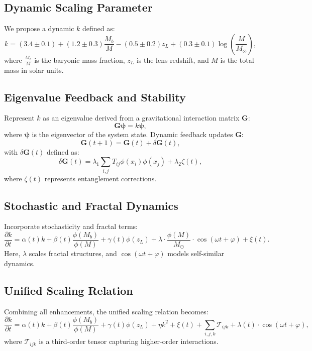\documentclass[12]{amsart}
\theoremstyle{plain}
\begin{document}
\subsection{Dynamic Scaling Parameter}
We propose a dynamic $k$ defined as:
\begin{equation}
    k = (3.4 \pm 0.1) + (1.2 \pm 0.3) \frac{M_b}{M} - (0.5 \pm 0.2) z_L + (0.3 \pm 0.1) \log\left(\frac{M}{M_\odot}\right),
\end{equation}
where $\frac{M_b}{M}$ is the baryonic mass fraction, $z_L$ is the lens redshift, and $M$ is the total mass in solar units.

\subsection{Eigenvalue Feedback and Stability}
Represent $k$ as an eigenvalue derived from a gravitational interaction matrix $\mathbf{G}$:
\begin{equation}
    \mathbf{G} \bm{\psi} = k \bm{\psi},
\end{equation}
where $\bm{\psi}$ is the eigenvector of the system state. Dynamic feedback updates $\mathbf{G}$:
\begin{equation}
    \mathbf{G}(t+1) = \mathbf{G}(t) + \delta \mathbf{G}(t),
\end{equation}
with $\delta \mathbf{G}(t)$ defined as:
\begin{equation}
    \delta \mathbf{G}(t) = \lambda_1 \sum_{i,j} T_{ij} \phi(x_i) \phi(x_j) + \lambda_2 \zeta(t),
\end{equation}
where $\zeta(t)$ represents entanglement corrections.

\subsection{Stochastic and Fractal Dynamics}
Incorporate stochasticity and fractal terms:
\begin{equation}
    \frac{\partial k}{\partial t} = \alpha(t) k + \beta(t) \frac{\phi(M_b)}{\phi(M)} + \gamma(t) \phi(z_L) + \lambda \cdot \frac{\phi(M)}{M_\odot} \cdot \cos(\omega t + \varphi) + \xi(t).
\end{equation}
Here, $\lambda$ scales fractal structures, and $\cos(\omega t + \varphi)$ models self-similar dynamics.

\subsection{Unified Scaling Relation}
Combining all enhancements, the unified scaling relation becomes:
\begin{equation}
    \frac{\partial k}{\partial t} = \alpha(t) k + \beta(t) \frac{\phi(M_b)}{\phi(M)} + \gamma(t) \phi(z_L) + \eta k^2 + \xi(t) + \sum_{i,j,k} \mathcal{T}_{ijk} + \lambda(t) \cdot \cos(\omega t + \varphi),
\end{equation}
where $\mathcal{T}_{ijk}$ is a third-order tensor capturing higher-order interactions.
\end{document}
